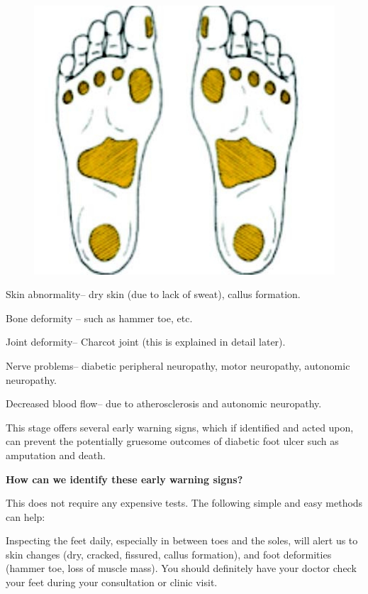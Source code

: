 \begin{figure}
\includegraphics{images/062.jpg}
\end{figure}

\item Skin abnormality– dry skin (due to lack of sweat), callus formation.

 \item Bone deformity – such as hammer toe, etc.

 \item Joint deformity– Charcot joint (this is explained in detail later).

 \item Nerve problems– diabetic peripheral neuropathy, motor neuropathy, autonomic neuropathy.

 \item Decreased blood flow– due to atherosclerosis and autonomic neuropathy.

This stage offers several early warning signs, which if identified and acted upon, can prevent the potentially gruesome outcomes of diabetic foot ulcer such as amputation and death.

\textbf{How can we identify these early warning signs?}

This does not require any expensive tests. The following simple and easy methods can help:

\item Inspecting the feet daily, especially in between toes and the soles, will alert us to skin changes (dry, cracked, fissured, callus formation), and foot deformities (hammer toe, loss of muscle mass). You should definitely have your doctor check your feet during your consultation or clinic visit.

